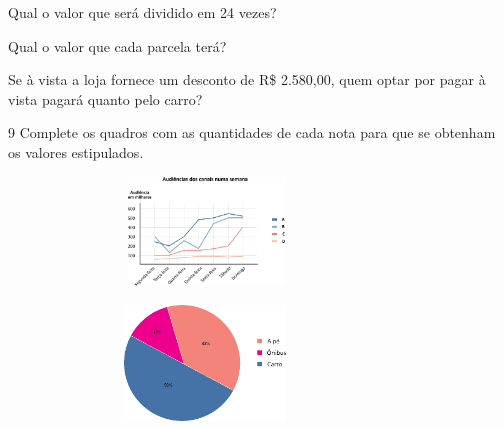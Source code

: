 \begin{multicols}{2}
\begin{escolha}
\item Qual o valor que será dividido em 24 vezes?


\item Qual o valor que cada parcela terá?


\item Se à vista a loja fornece um desconto de R\$ 2.580,00, quem optar por
  pagar à vista pagará quanto pelo carro?

\end{escolha}


\num{9}  Complete os quadros com as quantidades de cada nota para que se
obtenham os valores estipulados.

\begin{escolha}

\item
\includegraphics[width=4.14203in,height=1.14177in]{media/image77.png}


\item
\includegraphics[width=4.10036in,height=1.20844in]{media/image78.png}
\end{escolha}


\end{multicols}
